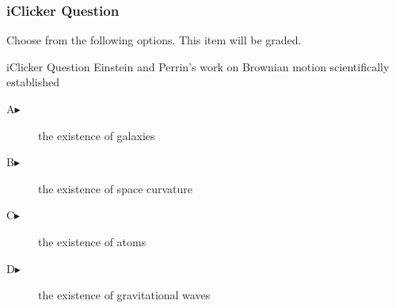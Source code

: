 \begin{frame}
  \frametitle{iClicker Question}
Choose from the following options. This item will be graded.
\begin{block}{iClicker Question}
Einstein and Perrin's work on Brownian motion scientifically
established 
\end{block}
\begin{description}
\item[A\hspace{.2in}$\blacktriangleright$] the existence of galaxies
\item[B\hspace{.2in}$\blacktriangleright$] the existence of space curvature
\item[C\hspace{.2in}$\blacktriangleright$] the existence of atoms
\item[D\hspace{.2in}$\blacktriangleright$] the existence of gravitational waves
\end{description}
\end{frame}
